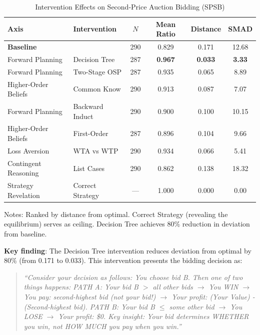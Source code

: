 \documentclass[12pt]{article}
\begin{document}
\begin{table}[h]
\centering
\caption{Intervention Effects on Second-Price Auction Bidding (SPSB)}
\label{tab:spsb_interventions}
\begin{tabular}{llcccc}
\toprule
Axis & Intervention & $N$ & Mean Ratio & Distance & SMAD \\
\midrule
\multicolumn{2}{l}{\textbf{Baseline}} & 290 & 0.829 & 0.171 & 12.68 \\
\midrule
Forward Planning & Decision Tree & 287 & \textbf{0.967} & \textbf{0.033} & \textbf{3.33} \\
Forward Planning & Two-Stage OSP & 287 & 0.935 & 0.065 & 8.89 \\
Higher-Order Beliefs & Common Know & 290 & 0.913 & 0.087 & 7.07 \\
Forward Planning & Backward Induct & 290 & 0.900 & 0.100 & 10.15 \\
Higher-Order Beliefs & First-Order & 287 & 0.896 & 0.104 & 9.66 \\
Loss Aversion & WTA vs WTP & 290 & 0.934 & 0.066 & 5.41 \\
Contingent Reasoning & List Cases & 290 & 0.862 & 0.138 & 18.32 \\
\midrule
Strategy Revelation & Correct Strategy & --- & 1.000 & 0.000 & 0.00 \\
\bottomrule
\end{tabular}
\smallskip
\begin{minipage}{0.9\textwidth}
\footnotesize
Notes: Ranked by distance from optimal. Correct Strategy (revealing the equilibrium) serves as ceiling. Decision Tree achieves 80\% reduction in deviation from baseline.
\end{minipage}
\end{table}

\textbf{Key finding}: The Decision Tree intervention reduces deviation from optimal by 80\% (from 0.171 to 0.033). This intervention presents the bidding decision as:

\begin{quote}
\textit{``Consider your decision as follows: You choose bid B. Then one of two things happens: PATH A: Your bid B $>$ all other bids $\rightarrow$ You WIN $\rightarrow$ You pay: second-highest bid (not your bid!) $\rightarrow$ Your profit: (Your Value) - (Second-highest bid). PATH B: Your bid B $\leq$ some other bid $\rightarrow$ You LOSE $\rightarrow$ Your profit: \$0. Key insight: Your bid determines WHETHER you win, not HOW MUCH you pay when you win.''}
\end{quote}
\end{document}

